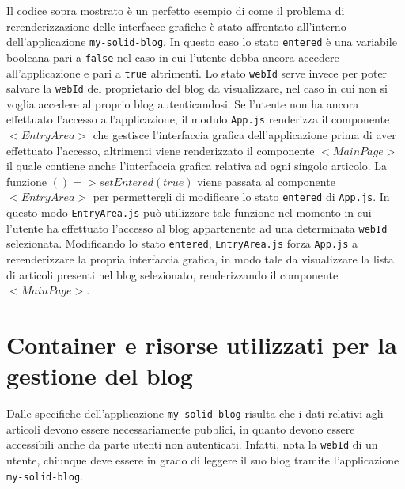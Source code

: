 \medskip

Il codice sopra mostrato è un perfetto esempio di come il problema di rerenderizzazione delle interfacce grafiche è stato affrontato all'interno dell'applicazione {\tt my-solid-blog}. In questo caso lo stato {\tt entered} è una variabile booleana pari a {\tt false} nel caso in cui l'utente debba ancora accedere all'applicazione e pari a {\tt true} altrimenti. Lo stato {\tt webId} serve invece per poter salvare la {\tt webId} del proprietario del blog da visualizzare, nel caso in cui non si voglia accedere al proprio blog autenticandosi. Se l'utente non ha ancora effettuato l'accesso all'applicazione, il modulo {\tt App.js} renderizza il componente $<EntryArea>$ che gestisce l'interfaccia grafica dell'applicazione prima di aver effettuato l'accesso, altrimenti viene renderizzato il componente $<MainPage>$ il quale contiene anche l'interfaccia grafica relativa ad ogni singolo articolo. La funzione $() => setEntered(true)$ viene passata al componente $<EntryArea>$ per permettergli di modificare lo stato {\tt entered} di {\tt App.js}. In questo modo {\tt EntryArea.js} può utilizzare tale funzione nel momento in cui l'utente ha effettuato l'accesso al blog appartenente ad una determinata {\tt webId} selezionata. Modificando lo stato {\tt entered}, {\tt EntryArea.js} forza {\tt App.js} a rerenderizzare la propria interfaccia grafica, in modo tale da visualizzare la lista di articoli presenti nel blog selezionato, renderizzando il componente $<MainPage>$.

\bigskip

\section{Container e risorse utilizzati per la gestione del blog}

\medskip

Dalle specifiche dell'applicazione {\tt my-solid-blog} risulta che i dati relativi agli articoli devono essere necessariamente pubblici, in quanto devono essere accessibili anche da parte utenti non autenticati. Infatti, nota la {\tt webId} di un utente, chiunque deve essere in grado di leggere il suo blog tramite l'applicazione {\tt my-solid-blog}.

\bigskip

